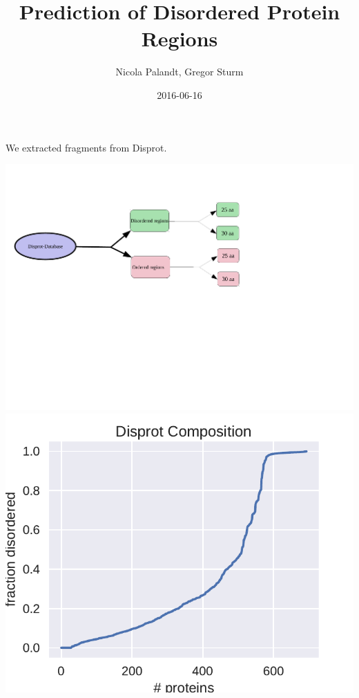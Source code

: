 \documentclass{beamer}
\title[disorder prediction]{Prediction of Disordered Protein Regions}
\subtitle{}
\date{2016-06-16}
\author{Nicola Palandt, Gregor Sturm}
\institute[rostlab]{Rostlab, Technical University of Munich}
\begin{document}
\maketitle

\begin{frame}{We extracted fragments from Disprot.}
\begin{center}
\includegraphics[width=.7\textwidth]{img/schema_preprocessing.pdf}\newline
\includegraphics[width=.4\textwidth]{img/disprot_comp.pdf}
\end{center}
\end{frame}
\end{document}
